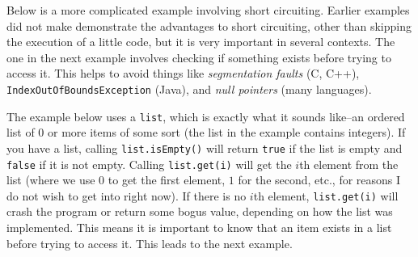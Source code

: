 Below is a more complicated example involving short circuiting.
Earlier examples did not make demonstrate the
advantages to short circuiting, 
other than skipping the execution of a little code, but it is
very important in several contexts. The one in the next example 
involves checking if something exists before trying to access it.
This helps to avoid things like {\em segmentation faults} (C, C++), \verb+IndexOutOfBoundsException+ (Java),
and {\em null pointers} (many languages).

The example below uses a \verb+list+, which is exactly what it sounds like--an ordered list of 0 or more items of some sort 
(the list in the example contains integers).
If you have a list, calling \verb+list.isEmpty()+ will return
\verb+true+ if the list is empty and \verb+false+ if it is not empty.
Calling \verb+list.get(i)+ will get the $i$th element from the
list (where we use $0$ to get the first element, $1$ for 
the second, etc., for reasons I do not wish to get into right now). 
If there is no $i$th element, \verb+list.get(i)+ will crash
the program or return some bogus value, depending on 
how the list was implemented. This means it is important
to know that an item exists in a list before trying to access it.
This leads to the next example.

